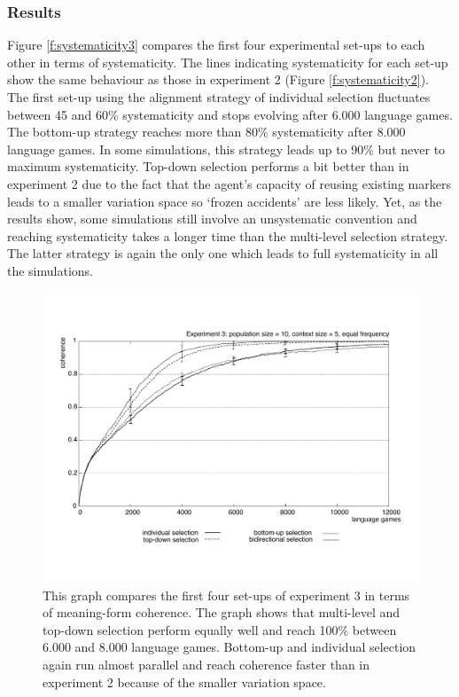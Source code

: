 \subsubsection{Results}
 Figure \ref{f:systematicity3} compares the first four experimental set-ups to each other in terms of systematicity. The lines indicating systematicity for each set-up show the same behaviour as those in experiment 2 (Figure \ref{f:systematicity2}). The first set-up using the alignment strategy of individual selection fluctuates between 45 and 60\% systematicity and stops evolving after 6.000 language games. The bottom-up strategy reaches more than 80\% systematicity after 8.000 language games. In some simulations, this strategy leads up to 90\% but never to maximum systematicity. Top-down selection performs a bit better than in experiment 2 due to the fact that the agent's capacity of reusing existing markers leads to a smaller variation space so `frozen accidents' are less likely. Yet, as the results show, some simulations still involve an unsystematic convention and reaching systematicity takes a longer time than the multi-level selection strategy. The latter strategy is again the only one which leads to full systematicity in all the simulations.

\begin{figure}[p]
\centerline{\includegraphics[width=\textwidth]{Chapter4/figs/coherence3}}
  \caption[Experiment 3: coherence]{This graph compares the first four set-ups of experiment 3 in terms of meaning-form coherence. The graph shows that multi-level and top-down selection perform equally well and reach 100\% between 6.000 and 8.000 language games. Bottom-up and individual selection again run almost parallel and reach coherence faster than in experiment 2 because of the smaller variation space.}
   \label{f:coherence3}
\end{figure}

